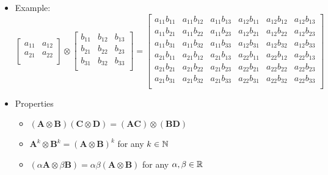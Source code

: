 \documentclass[12pt,a4paper]{article}
\begin{document}
\begin{itemize}
\begin{itemize}
  \item Example:
    \begin{equation}\nonumber%
      \begin{bmatrix}
        a_{11} & a_{12} \\
        a_{21} & a_{22} \\
      \end{bmatrix}
      \otimes
      \begin{bmatrix}
        b_{11} & b_{12} & b_{13} \\
        b_{21} & b_{22} & b_{23} \\
        b_{31} & b_{32} & b_{33} \\
      \end{bmatrix}
      = 
      \begin{bmatrix}
        a_{11}b_{11} & a_{11}b_{12} & a_{11}b_{13} & a_{12}b_{11} & a_{12}b_{12} & a_{12}b_{13} \\
        a_{11}b_{21} & a_{11}b_{22} & a_{11}b_{23} & a_{12}b_{21} & a_{12}b_{22} & a_{12}b_{23} \\
        a_{11}b_{31} & a_{11}b_{32} & a_{11}b_{33} & a_{12}b_{31} & a_{12}b_{32} & a_{12}b_{33} \\
        a_{21}b_{11} & a_{21}b_{12} & a_{21}b_{13} & a_{22}b_{11} & a_{22}b_{12} & a_{22}b_{13} \\
        a_{21}b_{21} & a_{21}b_{22} & a_{21}b_{23} & a_{22}b_{21} & a_{22}b_{22} & a_{22}b_{23} \\
        a_{21}b_{31} & a_{21}b_{32} & a_{21}b_{33} & a_{22}b_{31} & a_{22}b_{32} & a_{22}b_{33} \\
      \end{bmatrix}
    \end{equation}

  \item Properties

    \begin{itemize}
    \item $(\bm{A}\otimes \bm{B}) (\bm{C}\otimes \bm{D}) = (\bm{A}\bm{C})\otimes (\bm{B}\bm{D})$
    \item $\bm{A}^{k}\otimes \bm{B}^{k} = (\bm{A}\otimes \bm{B})^{k}$ for any $k\in \mathbb{N}$
    \item $(\alpha \bm{A}\otimes \beta \bm{B}) = \alpha \beta (\bm{A}\otimes \bm{B})$ for any $\alpha, \beta \in \mathbb{R}$
    \end{itemize}

  \end{itemize}

\end{itemize}
\end{document}
